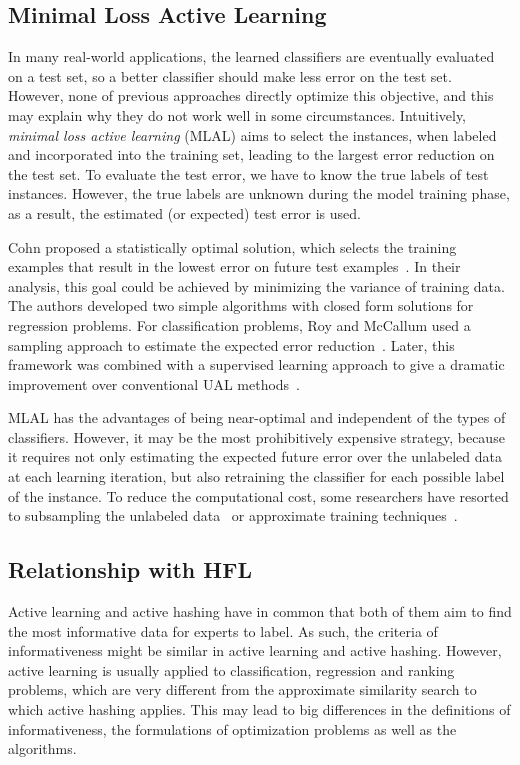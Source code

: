 \subsection{Minimal Loss Active Learning}

In many real-world applications, the learned classifiers are eventually evaluated on a test set, so a better classifier should make less error on the test set. However, none of previous approaches directly optimize this objective, and this may explain why they do not work well in some circumstances. Intuitively, \textit{minimal loss active learning} (\mbox{MLAL}) aims to select the instances, when labeled and incorporated into the training set, leading to the largest error reduction on the test set. To evaluate the test error, we have to know the true labels of test instances. However, the true labels are unknown during the model training phase, as a result, the estimated (or expected) test error is used.

Cohn \etal proposed a statistically optimal solution, which selects the training examples that result in the lowest error on future test examples~\cite{cohn1996jair}. In their analysis, this goal could be achieved by minimizing the variance of training data. The authors developed two simple algorithms with closed form solutions for regression problems. For classification problems, Roy and McCallum used a sampling approach to estimate the expected error reduction~\cite{Roy2001icml}. Later, this framework was combined with a supervised learning approach to give a dramatic improvement over conventional \mbox{UAL} methods~\cite{Zhu2003icmlws}.

\mbox{MLAL} has the advantages of being near-optimal and independent of the types of classifiers. However, it may be the most prohibitively expensive strategy, because it requires not only estimating the expected future error over the unlabeled data at each learning iteration, but also retraining the classifier for each possible label of the instance. To reduce the computational cost, some researchers have resorted to subsampling the unlabeled data~\cite{Roy2001icml} or approximate training techniques~\cite{guo2007ijcai}.

\subsection{Relationship with \mbox{HFL}}
Active learning and active hashing have in common that both of them aim to find the most informative data for experts to label. As such, the criteria of informativeness might be similar in active learning and active hashing. However, active learning is usually applied to classification, regression and ranking problems, which are very different from the approximate similarity search to which active hashing applies. This may lead to big differences in the definitions of informativeness, the formulations of optimization problems as well as the algorithms.

